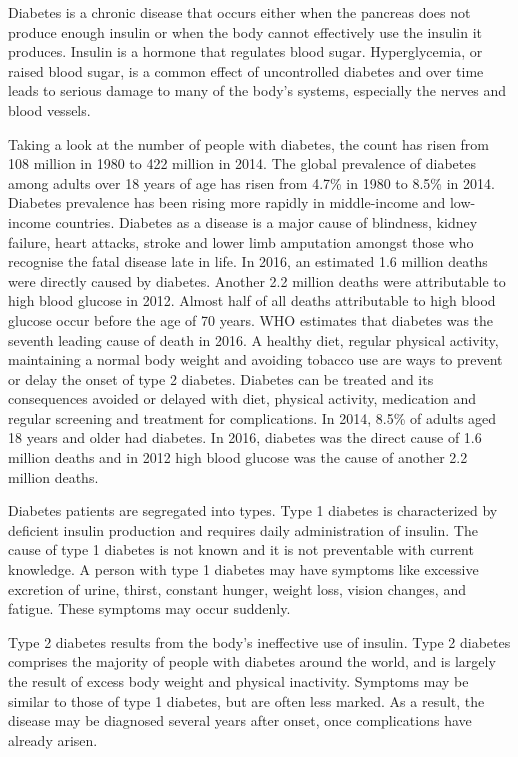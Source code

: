 \documentclass[12pt]{article}
\begin{document}
Diabetes is a chronic disease that occurs either when the pancreas does not produce enough insulin or when the body cannot effectively use the insulin it produces. Insulin is a hormone that regulates blood sugar. Hyperglycemia, or raised blood sugar, is a common effect of uncontrolled diabetes and over time leads to serious damage to many of the body's systems, especially the nerves and blood vessels.

Taking a look at the number of people with diabetes, the count has risen from 108 million in 1980 to 422 million in 2014.
The global prevalence of diabetes among adults over 18 years of age has risen from 4.7\% in 1980 to 8.5\% in 2014. Diabetes prevalence has been rising more rapidly in middle-income and low-income countries.
Diabetes as a disease is a major cause of blindness, kidney failure, heart attacks, stroke and lower limb amputation amongst those who recognise the fatal disease late in life.
In 2016, an estimated 1.6 million deaths were directly caused by diabetes. Another 2.2 million deaths were attributable to high blood glucose in 2012. Almost half of all deaths attributable to high blood glucose occur before the age of 70 years. WHO estimates that diabetes was the seventh leading cause of death in 2016. A healthy diet, regular physical activity, maintaining a normal body weight and avoiding tobacco use are ways to prevent or delay the onset of type 2 diabetes. Diabetes can be treated and its consequences avoided or delayed with diet, physical activity, medication and regular screening and treatment for complications. In 2014, 8.5\% of adults aged 18 years and older had diabetes. In 2016, diabetes was the direct cause of 1.6 million deaths and in 2012 high blood glucose was the cause of another 2.2 million deaths.

Diabetes patients are segregated into types. Type 1 diabetes is characterized by deficient insulin production and requires daily administration of insulin. The cause of type 1 diabetes is not known and it is not preventable with current knowledge. A person with type 1 diabetes may have symptoms like excessive excretion of urine, thirst, constant hunger, weight loss, vision changes, and fatigue. These symptoms may occur suddenly.

Type 2 diabetes results from the body’s ineffective use of insulin. Type 2 diabetes comprises the majority of people with diabetes around the world, and is largely the result of excess body weight and physical inactivity. Symptoms may be similar to those of type 1 diabetes, but are often less marked. As a result, the disease may be diagnosed several years after onset, once complications have already arisen.
\end{document}
